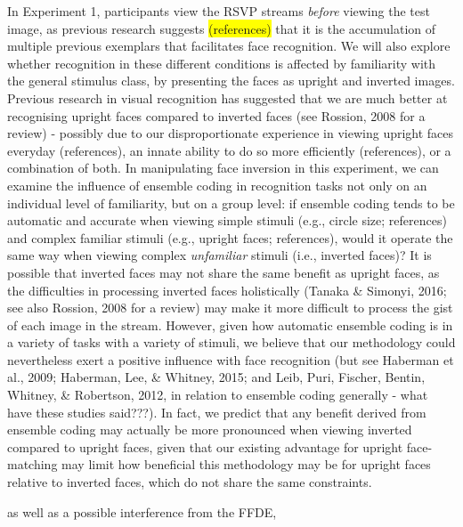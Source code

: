 \documentclass[
  english,
  man]{apa6}
\begin{document}
In Experiment 1, participants view the RSVP streams \emph{before} viewing the test image, as previous research suggests \colorbox{yellow}{(references)} that it is the accumulation of multiple previous exemplars that facilitates face recognition. We will also explore whether recognition in these different conditions is affected by familiarity with the general stimulus class, by presenting the faces as upright and inverted images. Previous research in visual recognition has suggested that we are much better at recognising upright faces compared to inverted faces (see Rossion, 2008 for a review) - possibly due to our disproportionate experience in viewing upright faces everyday (references), an innate ability to do so more efficiently (references), or a combination of both. In manipulating face inversion in this experiment, we can examine the influence of ensemble coding in recognition tasks not only on an individual level of familiarity, but on a group level: if ensemble coding tends to be automatic and accurate when viewing simple stimuli (e.g., circle size; references) and complex familiar stimuli (e.g., upright faces; references), would it operate the same way when viewing complex \emph{unfamiliar} stimuli (i.e., inverted faces)? It is possible that inverted faces may not share the same benefit as upright faces, as the difficulties in processing inverted faces holistically (Tanaka \& Simonyi, 2016; see also Rossion, 2008 for a review) may make it more difficult to process the gist of each image in the stream. However, given how automatic ensemble coding is in a variety of tasks with a variety of stimuli, we believe that our methodology could nevertheless exert a positive influence with face recognition (but see Haberman et al., 2009; Haberman, Lee, \& Whitney, 2015; and Leib, Puri, Fischer, Bentin, Whitney, \& Robertson, 2012, in relation to ensemble coding generally - what have these studies said???). In fact, we predict that any benefit derived from ensemble coding may actually be more pronounced when viewing inverted compared to upright faces, given that our existing advantage for upright face-matching may limit how beneficial this methodology may be for upright faces relative to inverted faces, which do not share the same constraints.

as well as a possible interference from the FFDE,
\end{document}
